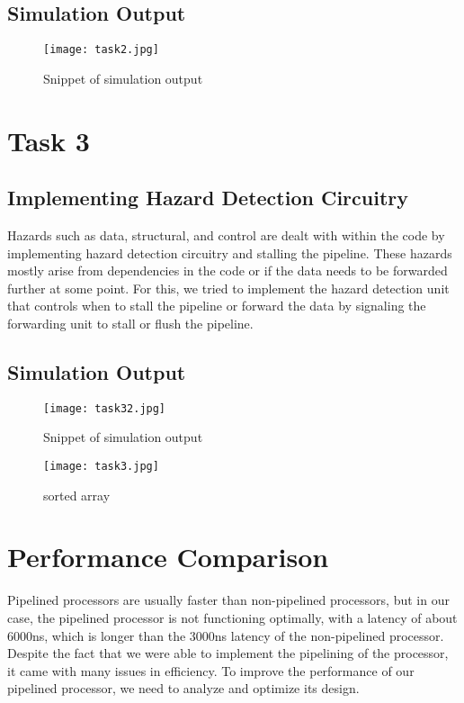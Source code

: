 \documentclass[12pt]{article}
\begin{document}
\subsection{Simulation Output}\label{code2}
    \begin{figure}[htbp!]
        \centering
        \texttt{[image: task2.jpg]}
        \caption{Snippet of simulation output}
    \end{figure}

\section{Task 3}\label{task3}
\subsection{Implementing Hazard Detection Circuitry}\label{hazards}
    Hazards such as data, structural, and control are dealt with within the code by implementing hazard detection circuitry and stalling the pipeline. These hazards mostly arise from dependencies in the code or if the data needs to be forwarded further at some point. For this, we tried to implement the hazard detection unit that controls when to stall the pipeline or forward the data by signaling the forwarding unit to stall or flush the pipeline.

\newpage
\subsection{Simulation Output}\label{code3}

    \begin{figure}[htbp!]
        \centering
        \texttt{[image: task32.jpg]}
        \caption{Snippet of simulation output}
    \end{figure}
    \begin{figure}[htbp!]
        \centering
        \texttt{[image: task3.jpg]}
        \caption{sorted array}
    \end{figure}

\section{Performance Comparison}\label{performance}
    Pipelined processors are usually faster than non-pipelined processors, but in our case, the pipelined processor is not functioning optimally, with a latency of about 6000ns, which is longer than the 3000ns latency of the non-pipelined processor. Despite the fact that we were able to implement the pipelining of the processor, it came with many issues in efficiency. To improve the performance of our pipelined processor, we need to analyze and optimize its design.
\end{document}
